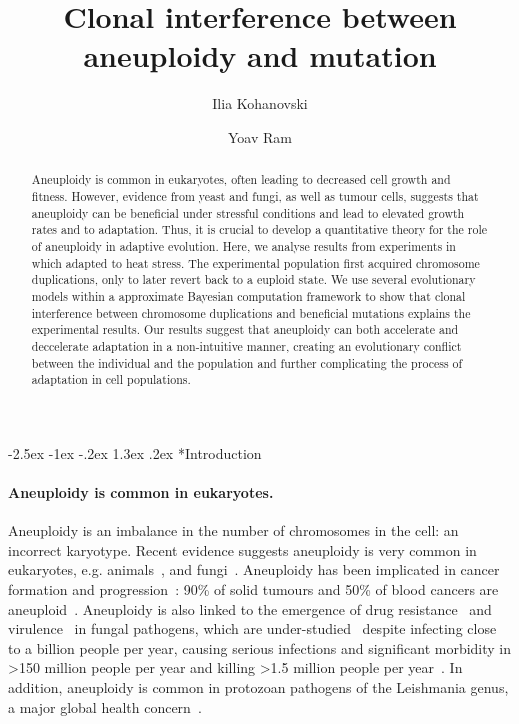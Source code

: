 \documentclass[12pt]{extarticle}
\title{Clonal interference between aneuploidy and mutation}
\author[1]{Ilia Kohanovski}
\author[1,2,*]{Yoav Ram}
\affil[1]{School of Computer Sciences, IDC Herzliya, Herzliya, Israel}
\affil[2]{School of Zoology, Faculty of Life Sciences, Tel Aviv University, Tel Aviv, Israel}
\affil[*]{Corresponding author: yoav@yoavram.com}
\makeatletter
\renewcommand\section{\@startsection {section}{1}{\z@}%
     {-2.5ex \@plus -1ex \@minus -.2ex}%
     {1.3ex \@plus.2ex}%
    {\Large\bfseries}}
\makeatother
\begin{document}
\maketitle

\begin{abstract}
Aneuploidy is common in eukaryotes, often leading to decreased cell growth and fitness. However, evidence from yeast and fungi, as well as tumour cells, suggests that aneuploidy can be beneficial under stressful conditions and  lead to elevated growth rates and to adaptation. Thus, it is crucial to develop a quantitative theory for the role of aneuploidy in adaptive evolution. Here, we analyse results from experiments in which \yeast adapted to heat stress. The experimental population first acquired chromosome duplications, only to later revert back to a euploid state. We use several evolutionary models within a approximate Bayesian computation framework to show that clonal interference between chromosome duplications and beneficial mutations explains the experimental results. Our results suggest that aneuploidy can both accelerate and deccelerate adaptation in a non-intuitive manner, creating an evolutionary conflict between the individual and the population and further complicating the process of adaptation in cell populations.
\end{abstract}


\pagebreak
\section*{Introduction}

\paragraph*{Aneuploidy is common in eukaryotes.}
Aneuploidy is an imbalance in the number of chromosomes in the cell: an incorrect karyotype.
Recent evidence suggests aneuploidy is very common in eukaryotes, e.g. animals~\citep{Santaguida2015review, Naylor2016, Bakhoum2017}, and fungi~\citep{Pavelka2010, Zhu2016, Robbins2017, Todd2017}.
Aneuploidy has been implicated in cancer formation and progression~\citep{Boveri2008, Schvartzman2010}: 
90\% of solid tumours and 50\% of blood cancers are aneuploid~\citep{Santaguida2015review}.
Aneuploidy is also linked to the emergence of drug resistance~\citep{Selmecki2009} and virulence~\citep{Moller2018} in fungal pathogens, which are under-studied~\citep{Rodrigues2018} despite infecting close to a billion people per year, causing serious infections and significant morbidity in >150 million people per year and killing >1.5 million people per year~\citep{Selmecki2009, Rodrigues2018}.
In addition, aneuploidy is common in protozoan pathogens of the Leishmania genus, a major global health concern~\citep{Mannaert2012}.
\end{document}
